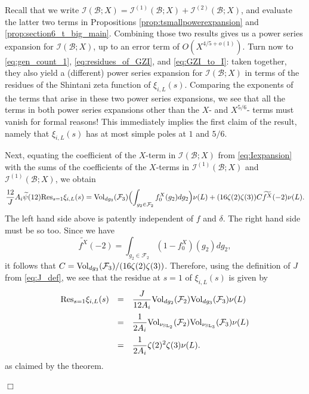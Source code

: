 \documentclass{article}
\def\SL{{\rm SL}}
\def\Res{{\rm Res}}
\def\Vol{{\rm Vol}}
\def\cB{{\mathcal B}}
\def\FF{{\mathcal F}}
\def\I{{\mathcal I}}
\def\wt{\widetilde}
\newenvironment{proof}{\noindent {\bf Proof:}}{$\Box$ \vspace{2 ex}}
\begin{document}
\begin{proof}
Recall that we write $\I(\cB;X)=\I^{(1)}(\cB;X)+\I^{(2)}(\cB;X)$, and evaluate the latter two terms in Propositions \ref{prop:tsmallpowerexpansion} and \ref{prop:section6_t_big_main}. Combining those two results gives us a power series expansion for $\I(\cB;X)$, up to an error term of $O(X^{4/5+o(1)})$. Turn now to \eqref{eq:gen_count_1}, \eqref{eq:residues_of_GZI}, and \eqref{eq:GZI_to_I}: taken together, they also yield a (different) power series expansion for $\I(\cB;X)$ in terms of the residues of the Shintani zeta function of $\xi_{i,L}(s)$. Comparing the exponents of the terms that arise in these two power series expansions, we see that all the terms in both power series expansions other than the $X$- and $X^{5/6}$- terms must vanish for formal reasons! This immediately implies the first claim of the result, namely that $\xi_{i,L}(s)$ has at most simple poles at $1$ and $5/6$. 

Next, equating the coefficient of the $X$-term in $\I(\cB;X)$ from \eqref{eq:Iexpansion} with the sums of the coefficients of the $X$-terms in $\I^{(1)}(\cB;X)$ and $\I^{(1)}(\cB;X)$, we obtain
\begin{equation*}
\frac{12}{J}A_i\wt{\psi}(12)\Res_{s=1}\xi_{i,L}(s)
= 
\Vol_{dg_3}(\FF_3)\Bigl(\int_{g_2\in\FF_2}f_0^X(g_2)dg_2\Bigr)\nu(L)
+
(16\zeta(2)\zeta(3))C\wt{f^X}(-2)\nu(L).
\end{equation*}
The left hand side above is patently independent of $f$ and $\delta$. The right hand side must be so too. Since we have 
$$\wt{f^X}(-2)=\int_{g_2\in\FF_2}(1-f_0^{X})(g_2)dg_2,$$
it follows that $C=\Vol_{dg_3}(\FF_3)/(16\zeta(2)\zeta(3))$. Therefore, using the definition of $J$ from \eqref{eq:J_def}, we see that the residue at $s=1$ of $\xi_{i,L}(s)$ is given by
\begin{equation*}
\begin{array}{rcl}
\Res_{s=1}\xi_{i,L}(s)&=&
\displaystyle\frac{J}{12A_i}\Vol_{dg_2}(\FF_2)\Vol_{dg_3}(\FF_3)\nu(L)
\\[.15in]
&=&
\displaystyle\frac{1}{2A_i}\Vol_{\nu_{\SL_2}}(\FF_2)\Vol_{\nu_{\SL_3}}(\FF_3)\nu(L)
\\[.15in]
&=&
\displaystyle\frac{1}{2A_i}\zeta(2)^2\zeta(3)\nu(L).
\end{array}
\end{equation*}
as claimed by the theorem.


\end{proof}
\end{document}

